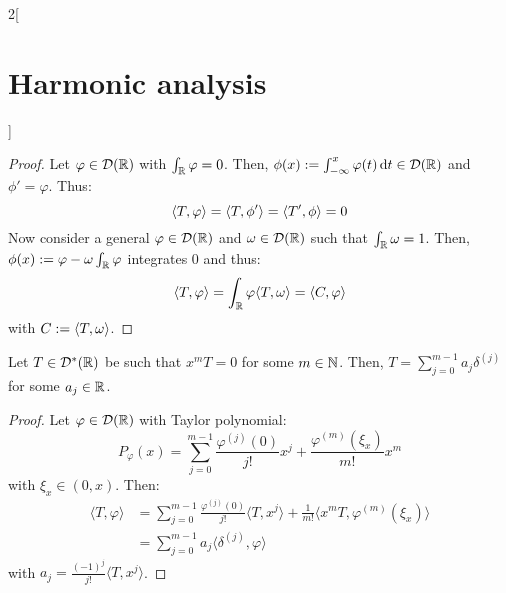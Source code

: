 \documentclass[../../../main_math.tex]{subfiles}
\begin{document}
\begin{multicols}{2}[\section{Harmonic analysis}]
\begin{proposition}
  \end{proposition}
  \begin{proof}
    Let $\varphi\in\mathcal{D}(\mathbb{R})$ with $\int_{\mathbb{R}}\varphi=0$. Then, $\phi(x):=\int_{-\infty}^x\varphi(t)\dd{t}\in\mathcal{D}(\mathbb{R})$ and $\phi'=\varphi$. Thus:
    $$
      {\left\langle T,\varphi\right\rangle}={\left\langle T,\phi'\right\rangle}={\left\langle T',\phi\right\rangle}=0
    $$
    Now consider a general $\varphi\in \mathcal{D}(\mathbb{R})$ and $\omega \in \mathcal{D}(\mathbb{R})$ such that $\int_{\mathbb{R}} \omega = 1$. Then, $\phi(x):=\varphi - \omega \int_{\mathbb{R}}\varphi$ integrates 0 and thus:
    $$
      {\left\langle T,\varphi\right\rangle} =\int_{\mathbb{R}}\varphi{\left\langle T,\omega\right\rangle} = {\left\langle C,\varphi\right\rangle}
    $$
    with $C:={\left\langle T,\omega\right\rangle}$.
  \end{proof}
  \begin{proposition}\label{HA:xmT_equal_0}
    Let $T\in \mathcal{D}^*(\mathbb{R})$ be such that $x^m T=0$ for some $m\in\mathbb{N}$. Then, $T=\sum_{j=0}^{m-1}a_j\delta^{(j)}$ for some $a_j\in\mathbb{R}$.
  \end{proposition}
  \begin{proof}
    Let $\varphi\in\mathcal{D}(\mathbb{R})$ with Taylor polynomial:
    $$
      P_\varphi (x)=\sum_{j=0}^{m-1}\frac{\varphi^{(j)}(0)}{j!}x^j+\frac{\varphi^{(m)}(\xi_x)}{m!}x^m
    $$
    with $\xi_x\in(0,x)$. Then:
    \begin{align*}
      \langle T,\varphi\rangle & =\sum_{j= 0}^{m-1} \frac{\varphi^{(j)}(0)}{j!}\langle T,x^j\rangle+\frac{1}{m!}\langle x^m T,\varphi^{(m)}(\xi_x)\rangle \\
                               & =\sum_{j= 0}^{m-1} a_j\langle \delta^{(j)},\varphi\rangle
    \end{align*}
    with $a_j=\frac{{(-1)^j}}{j!}\langle T,x^j\rangle$.
  \end{proof}

\end{multicols}
\end{document}
